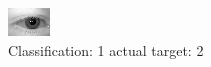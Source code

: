 \begin{figure}[h!]
\begin{center}
\includegraphics[width=0.60\columnwidth]{figures/ID352_class_1_target_2.png}
\end{center}
\caption{ Classification: 1 actual target: 2}
\label{fig:ID352_class_1_target_2}
\end{figure}

